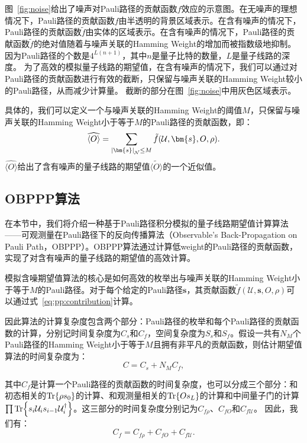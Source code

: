图~\ref{fig:noise}给出了噪声对Pauli路径的贡献函数$f$效应的示意图。在无噪声的理想情况下，Pauli路径的贡献函数$f$由半透明的背景区域表示。在含有噪声的情况下，Pauli路径的贡献函数$\tilde{f}$由实体的区域表示。在含有噪声的情况下，Pauli路径的贡献函数$\tilde{f}$的绝对值随着与噪声关联的Hamming Weight的增加而被指数级地抑制。因为Pauli路径的个数是$4^{L(n+1)}$，其中$n$是量子比特的数量，$L$是量子线路的深度。
为了高效的模拟量子线路的期望值，在含有噪声的情况下，我们可以通过对Pauli路径的贡献函数进行有效的截断，只保留与噪声关联的Hamming Weight较小的Pauli路径，从而减少计算量。
截断的部分在图~\ref{fig:noise}中用灰色区域表示。

具体的，我们可以定义一个与噪声关联的Hamming Weight的阈值$M$，只保留与噪声关联的Hamming Weight小于等于$M$的Pauli路径的贡献函数，即：
\begin{equation}\label{eq:truncated_expectation}
    \widehat{\langle O \rangle} = \sum_{\abs{\bm{s}}_{\mathcal{N}}\leq M} \tilde{f}(\mathcal{U},\bm{s},O,\rho).
\end{equation}
$\widehat{\langle O \rangle}$给出了含有噪声的量子线路的期望值$\widetilde{\langle O \rangle}$的一个近似值。

\subsection{OBPPP算法}\label{sec:obppp}
在本节中，我们将介绍一种基于Pauli路径积分模拟的量子线路期望值计算算法——可观测量在Pauli路径下的反向传播算法（Observable's Back-Propagation on Pauli Path，OBPPP）。OBPPP算法通过计算低weight的Pauli路径的贡献函数，实现了对含有噪声的量子线路的期望值的高效计算。

模拟含噪期望值算法的核心是如何高效的枚举出与噪声关联的Hamming Weight小于等于$M$的Pauli路径。对于每个给定的Pauli路径$\bm{s}$，其贡献函数$\tilde{f}(\mathcal{U},\bm{s},O,\rho)$可以通过式~\eqref{eq:pp:contribution}计算。

因此算法的计算复杂度包含两个部分：Pauli路径的枚举和每个Pauli路径的贡献函数的计算，分别记时间复杂度为$C_s$和$C_f$，空间复杂度为$S_s$和$S_f$。假设一共有$N_M$个Pauli路径的Hamming Weight小于等于$M$且拥有非平凡的贡献函数，则估计期望值算法的时间复杂度为：
\begin{equation}\label{eq:total_cost}
    C = C_s+N_MC_f,
\end{equation}

其中$C_f$是计算一个Pauli路径的贡献函数的时间复杂度，也可以分成三个部分：和初态相关的$\Tr{\rho s_0}$的计算、和观测量相关的$\Tr{Os_L}$的计算和中间量子门的计算$\prod\Tr{s_i\mathcal{U}_i s_{i-1}\mathcal{U}_i^\dagger}$。这三部分的时间复杂度分别记为$C_{f\rho}$、$C_{fO}$和$C_{f\mathcal{U}}$。
因此，我们有：
\begin{equation}\label{eq:cost_f}
    C_f = C_{f\rho}+C_{fO}+C_{f\mathcal{U}}.
\end{equation}


